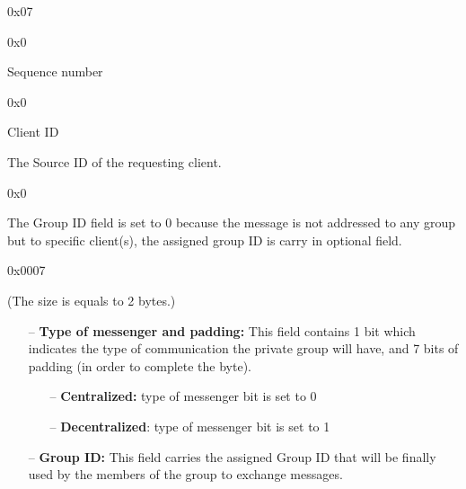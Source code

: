 \documentclass{article}
\begin{document}
\begin{description}[align=left]
    \item [Type:] 0x07
    
    \item [Reserved:] 0x0
        
    \item [Sequence:] Sequence number
    
    \item [Acknowledgement:] 0x0

    \item [Source ID:] Client ID
    \begin{flushleft}
        The Source ID of the requesting client.
    \end{flushleft}
    
    \item [Group ID:] 0x0
    \begin{flushleft}
        The Group ID field is set to 0 because the message is not addressed to any group but to specific client(s), the assigned group ID is carry in optional field. 
    \end{flushleft}
    
    \item [Header Length:] 0x0007
    
    \item[Options:] (The size is equals to 2 bytes.)
    \begin{itemize}
        \item[--]\textbf{Type of messenger and padding:} This field contains 1 bit which indicates the type of communication the private group will have, and 7 bits of padding (in order to complete the byte).
        \begin{itemize}
        \item[--]\textbf{Centralized:} type of messenger bit is set to 0
        \item[--]\textbf{Decentralized}: type of messenger bit is set to 1
        \end{itemize}
        \item[--]\textbf{Group ID:} This field carries the assigned Group ID that will be finally used by the members of the group to exchange messages. 
    \end{itemize}
\end{description}
\end{document}
